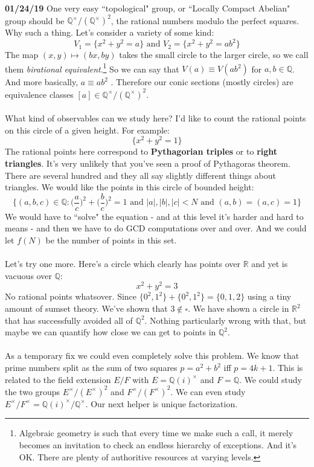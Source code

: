 \documentclass[12pt]{article}
\begin{document}
\newpage


\noindent \textbf{01/24/19} One very easy ``topological" group, or ``Locally Compact Abelian" group should be $\mathbb{Q}^\times/(\mathbb{Q}^\times)^2$, the rational numbers modulo the perfect squares.  Why such a thing.  Let's consider a variety of some kind:
$$ V_1  = \{ x^2 + y^2 = a \}  \text{ and } V_2 = \{ x^2 + y^2 = ab^2 \}$$
The map $(x,y) \mapsto (bx,by)$ takes the small circle to the larger circle, so we call them \textit{birational equivalent}.\footnote{Algebraic geometry is such that every time we make such a call, it merely becomes an invitation to check an endless hierarchy of exceptions.  And it's OK.  There are plenty of authoritive resources at varying levels.}  So we can say that $V(a) \equiv V(ab^2)$ for $a,b \in \mathbb{Q}$.  And more basically, $a  \equiv ab^2$ .  Therefore our conic sections (mostly circles) are equivalence classes $[a] \in \mathbb{Q}^\times/(\mathbb{Q}^\times)^2$. \\ \\
What kind of observables can we study here?  I'd like to count the rational points on this circle of a given height.  For example:
$$ \{ x^2 + y^2 = 1 \} $$
The rational points here correspond to \textbf{Pythagorian triples}  or to \textbf{right triangles}.  It's very unlikely that you've seen a proof of Pythagoras theorem.  There are several hundred and they all say slightly different things about triangles.  We would like the points in this circle of bounded height:
$$ \Big\{ (a,b,c) \in \mathbb{Q} : \Big( \frac{a}{c}\Big)^2 + \Big(\frac{b}{c}\Big)^2 = 1 \text{ and } |a|,|b|,|c| < N \text{ and } (a,b)=(a,c)=1\Big\} $$
We would have to ``solve" the equation - and at this level it's harder and hard to means - and then we have to do GCD computations over and over.  And we could let $f(N)$ be the number of points in this set.  \\ \\
Let's try one more.  Here's a circle which clearly has points over $\mathbb{R}$ and yet is vacuous over $\mathbb{Q}$:
$$ x^2 + y^2 = 3 $$
No rational points whatsover.  Since $\{ 0^2, 1^2\} + \{ 0^2 , 1^2 \}  = \{ 0,1,2\}$ using a tiny amount of sumset theory.  We've shown that $3 \notin \square$.  We have shown a circle in $\mathbb{R}^2$ that has successfully avoided all of $\mathbb{Q}^2$.  Nothing particularly wrong with that, but maybe we can quantify how close  we can get to points in $\mathbb{Q}^2$. \\ \\
As a temporary fix we could even completely solve this problem.  We know that prime numbers split as the sum of two squares $p = a^2 + b^2$ iff $p = 4k+1$.  This is related to the field extension $E/F$ with $E = \mathbb{Q}(i)^\times$ and $F = \mathbb{Q}$.  We could study the two groups $E^\times /(E^\times)^2$ and $F^\times/(F^\times)^2$.  We can even study $E^\times / F^\times  = \mathbb{Q}(i)^\times/\mathbb{Q}^\times$.  Our next helper is unique factorization.  
\end{document}
